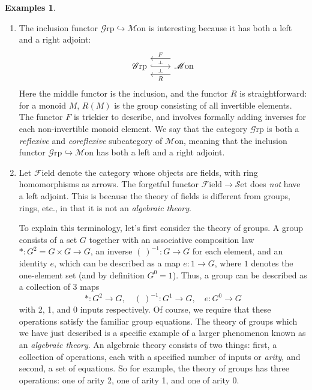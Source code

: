 \documentclass[10pt,oneside]{book}
\def\~#1{\mathscr{#1}}
\newcommand{\mono}{\hookrightarrow}
\newcommand{\Set}{\~S\mathrm{et}}
\newcommand{\Grp}{\~G\mathrm{rp}}
\newcommand{\Mon}{\~M\mathrm{on}}
\newcommand{\Field}{\~F\mathrm{ield}}
\theoremstyle{plain}
\theoremstyle{definition}
\newtheorem{exs}[thm]{Examples}
\theoremstyle{remark}
\numberwithin{equation}{section}
\numberwithin{figure}{section}
\begin{document}
\begin{exs}
\begin{enumerate}[label=(\roman*)]
        \item The inclusion functor $\Grp \mono \Mon$ is interesting because it has both a left and a right adjoint:
        \[\begin{tikzcd}
            \Grp & \Mon
            \arrow[""{name=0, anchor=center, inner sep=0}, hook, from=1-1, to=1-2]
            \arrow[""{name=1, anchor=center, inner sep=0}, "R", shift left=4, from=1-2, to=1-1]
            \arrow[""{name=2, anchor=center, inner sep=0}, "F"', shift right=4, from=1-2, to=1-1]
            \arrow["\dashv"{anchor=center, rotate=-90}, draw=none, from=0, to=1]
            \arrow["\dashv"{anchor=center, rotate=-90}, draw=none, from=2, to=0]
        \end{tikzcd}\]
        Here the middle functor is the inclusion, and the functor $R$ is straightforward: for a monoid $M$, $R(M)$ is the group consisting of all invertible elements. The functor $F$ is trickier to describe, and involves formally adding inverses for each non-invertible monoid element. We say that the category $\Grp$ is both a \emph{reflexive} and \emph{coreflexive} subcategory of $\Mon$, meaning that the inclusion functor $\Grp \mono \Mon$ has both a left and a right adjoint.

        \item Let $\Field$ denote the category whose objects are fields, with ring homomorphisms as arrows. The forgetful functor $\Field \to \Set$ does \emph{not} have a left adjoint. This is because the theory of fields is different from groups, rings, etc., in that it is not an \emph{algebraic theory}. 

        To explain this terminology, let's first consider the theory of groups. A group consists of a set $G$ together with an associative composition law $\ast: G^2 = G \times G \to G$, an inverse $(~)^{-1}: G \to G$ for each element, and an identity $e$, which can be described as a map $e: 1 \to G$, where $1$ denotes the one-element set (and by definition $G^0 = 1$). Thus, a group can be described as a collection of 3 maps
        \[\ast: G^2 \to G, \quad (~)^{-1}: G^1 \to G, \quad e: G^0 \to G\]
        with 2, 1, and 0 inputs respectively. Of course, we require that these operations satisfy the familiar group equations. The theory of groups which we have just described is a specific example of a larger phenomenon known as an \emph{algebraic theory}. An algebraic theory consists of two things: first, a collection of operations, each with a specified number of inputs or \emph{arity}, and second, a set of equations. So for example, the theory of groups has three operations: one of arity 2, one of arity 1, and one of arity 0. 


\end{enumerate}
\end{exs}
\end{document}
